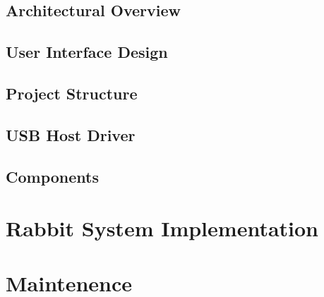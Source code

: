 \documentclass{article}
\begin{document}
\subsection{Architectural Overview}

\subsection{User Interface Design}

\subsection{Project Structure}

\subsection{USB Host Driver}

\subsection{Components}

\section{Rabbit System Implementation}

\section{Maintenence}
\end{document}
